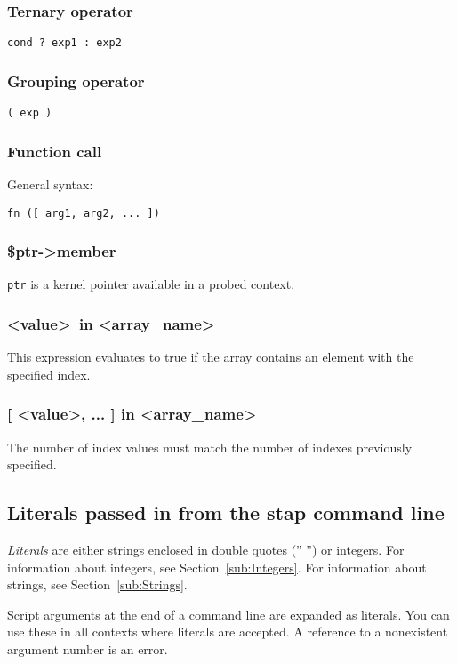 \documentclass[twoside,english]{article}
\begin{document}
\subsubsection{Ternary operator\label{sub:Ternary-operator}}
\texttt{cond ? exp1 : exp2}


\subsubsection{Grouping operator}
\texttt{( exp )}


\subsubsection{Function call}
General syntax:

\texttt{fn ({[} arg1, arg2, ... ])}


\subsubsection{\$ptr-\textgreater member}
\texttt{ptr} is a kernel pointer available in a probed context.


\subsubsection{\textless value\textgreater\ in \textless array\_name\textgreater}
This expression evaluates to true if the array contains an element with the
specified index.


\subsubsection{{[} \textless value\textgreater, ... ] in \textless array\_name\textgreater}

The number of index values must match the number of indexes previously specified.


\subsection{Literals passed in from the stap command line\label{sub:Literals-passed-in}}
\emph{Literals} are either strings enclosed in double quotes ('' '') or
integers. For information about integers, see Section~\ref{sub:Integers}.
For information about strings, see Section~\ref{sub:Strings}.

Script arguments at the end of a command line are expanded as literals. You
can use these in all contexts where literals are accepted. A reference to
a nonexistent argument number is an error.
\end{document}
